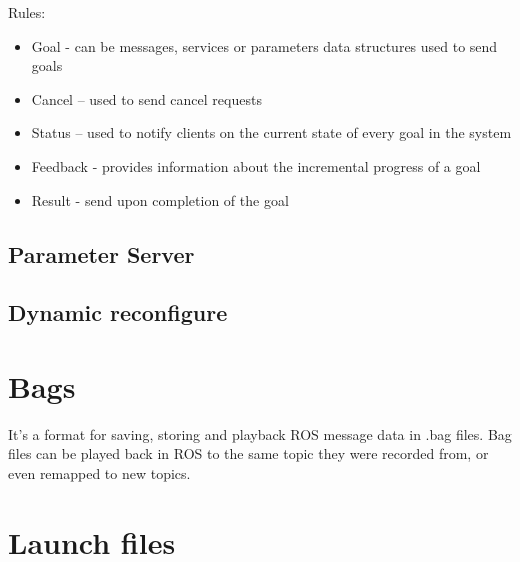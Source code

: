             Rules:
            \begin{itemize}
                \item Goal - can be messages, services or parameters data structures used to send goals
                \item Cancel – used to send cancel requests
                \item Status – used to notify clients on the current state of every goal in the system
                \item Feedback - provides information about the incremental progress of a goal
                \item Result - send upon completion of the goal
            \end{itemize}



        \subsection{Parameter Server}
        
        
        \subsection{Dynamic reconfigure}
        






    \section{Bags}
        It’s a format for saving, storing and playback ROS message data in .bag files.
        Bag files can be played back in ROS to the same topic they were recorded from, or even remapped to new topics.

    

    \section{Launch files}




        

